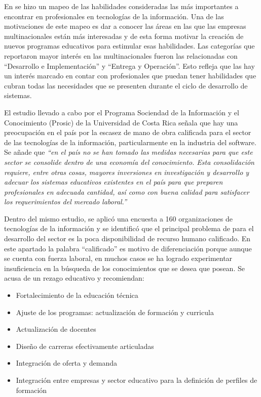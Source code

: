 \documentclass[journal]{IEEEtran}
\begin{document}
En \cite{murillo-trejos} se hizo un mapeo de las habilidades consideradas las más importantes a encontrar en profesionales en tecnologías de la información. Una de las motivaciones de este mapeo es dar a conocer las áreas en las que las empresas multinacionales están más interesadas y de esta forma motivar la creación de nuevos programas educativos para estimular esas habilidades. Las categorías que reportaron mayor interés en las multinacionales fueron las relacionadas con ``Desarrollo e Implementación'' y ``Entrega y Operación''. Esto refleja que las hay un interés marcado en contar con profesionales que puedan tener habilidades que cubran todas las necesidades que se presenten durante el ciclo de desarrollo de sistemas.


El estudio llevado a cabo por el Programa Sociendad de la Información y el Conocimiento \cite{prosic}(Prosic) de la Universidad de Costa Rica señala que hay una preocupación en el país por la escasez de mano de obra calificada para el sector de las tecnologías de la información, particularmente en la industria del software. Se añade que \emph{``en el país no se han tomado las medidas necesarias para que este sector se consolide dentro de una economía del conocimiento. Esta consolidación requiere, entre otras cosas, mayores inversiones en investigación y desarrollo y
adecuar los sistemas educativos existentes en el país para que preparen profesionales en adecuada cantidad, así como con buena calidad para satisfacer los requerimientos del mercado laboral.''}

Dentro del mismo estudio, se aplicó una encuesta a 160 organizaciones de tecnologías de la información y se identificó que el principal problema de para el desarrollo del sector es la poca disponibilidad de recurso humano calificado. En este apartado la palabra ``calificado'' es motivo de diferenciación porque aunque se cuenta con fuerza laboral, en muchos casos se ha logrado experimentar insuficiencia en la búsqueda de los conocimientos que se desea que posean. Se acusa de un rezago educativo y recomiendan:
\begin{itemize}
    \item Fortalecimiento de la educación técnica
    \item Ajuste de los programas: actualización de formación y curricula
    \item Actualización de docentes
    \item Diseño de carreras efectivamente articuladas
    \item Integración de oferta y demanda
    \item Integración entre empresas y sector educativo para la definición de perfiles de formación
\end{itemize}
\end{document}
